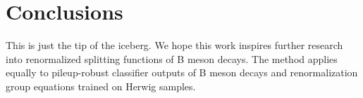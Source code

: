 \section{Conclusions}\label{sec:conclusions}

This is just the tip of the iceberg. We hope this work inspires further
research into renormalized splitting functions of B meson decays. The
method applies equally to pileup-robust classifier outputs of B meson
decays and renormalization group equations trained on Herwig samples.

